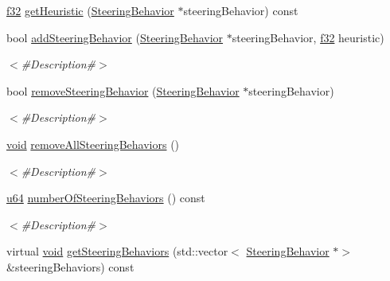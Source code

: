\begin{DoxyCompactItemize}
\item 
\mbox{\hyperlink{_util_8h_a5f6906312a689f27d70e9d086649d3fd}{f32}} \mbox{\hyperlink{classnjli_1_1_steering_behavior_machine_a577fa9c6dcf0b5f5b742db4304792436}{get\+Heuristic}} (\mbox{\hyperlink{classnjli_1_1_steering_behavior}{Steering\+Behavior}} $\ast$steering\+Behavior) const
\item 
bool \mbox{\hyperlink{classnjli_1_1_steering_behavior_machine_aea8d4a3f11d710510a6362acc5e37f8d}{add\+Steering\+Behavior}} (\mbox{\hyperlink{classnjli_1_1_steering_behavior}{Steering\+Behavior}} $\ast$steering\+Behavior, \mbox{\hyperlink{_util_8h_a5f6906312a689f27d70e9d086649d3fd}{f32}} heuristic)
\begin{DoxyCompactList}\small\item\em $<$\#\+Description\#$>$ \end{DoxyCompactList}\item 
bool \mbox{\hyperlink{classnjli_1_1_steering_behavior_machine_a8a14a3f6b951ddcf05a27256c3d21efe}{remove\+Steering\+Behavior}} (\mbox{\hyperlink{classnjli_1_1_steering_behavior}{Steering\+Behavior}} $\ast$steering\+Behavior)
\begin{DoxyCompactList}\small\item\em $<$\#\+Description\#$>$ \end{DoxyCompactList}\item 
\mbox{\hyperlink{_thread_8h_af1e856da2e658414cb2456cb6f7ebc66}{void}} \mbox{\hyperlink{classnjli_1_1_steering_behavior_machine_ac480ec6e9f11918adee87d95167b9b25}{remove\+All\+Steering\+Behaviors}} ()
\begin{DoxyCompactList}\small\item\em $<$\#\+Description\#$>$ \end{DoxyCompactList}\item 
\mbox{\hyperlink{_util_8h_ad758b7a5c3f18ed79d2fcd23d9f16357}{u64}} \mbox{\hyperlink{classnjli_1_1_steering_behavior_machine_abc8ac2f926c76602a5413baa12ba6f7b}{number\+Of\+Steering\+Behaviors}} () const
\begin{DoxyCompactList}\small\item\em $<$\#\+Description\#$>$ \end{DoxyCompactList}\item 
virtual \mbox{\hyperlink{_thread_8h_af1e856da2e658414cb2456cb6f7ebc66}{void}} \mbox{\hyperlink{classnjli_1_1_steering_behavior_machine_a5f16284442c65dd387dce41393b30c4d}{get\+Steering\+Behaviors}} (std\+::vector$<$ \mbox{\hyperlink{classnjli_1_1_steering_behavior}{Steering\+Behavior}} $\ast$$>$ \&steering\+Behaviors) const
$$
\end{DoxyCompactItemize}
